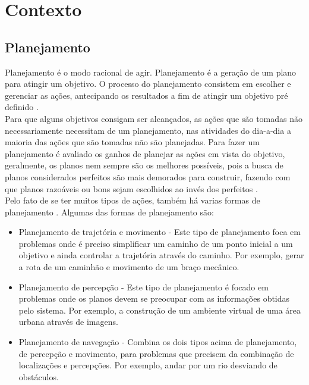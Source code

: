 \chapter{\label{chap:conte}Contexto}


\section{Planejamento} 


Planejamento é o modo racional de agir. Planejamento é a geração de um plano para atingir um objetivo. O processo do planejamento consistem em escolher e gerenciar as ações, antecipando os resultados a fim de atingir um objetivo pré definido \cite{ghallab2004automated}. \\
Para que alguns objetivos consigam ser alcançados, as ações que são tomadas não necessariamente necessitam de um planejamento, nas atividades do dia-a-dia a maioria das ações que são tomadas não são planejadas. Para fazer um planejamento é avaliado os ganhos de planejar as ações em vista do objetivo, geralmente, os planos nem sempre são os melhores possíveis, pois a busca de planos considerados perfeitos são mais demorados para construir, fazendo com que planos razoáveis ou bons sejam escolhidos ao invés dos perfeitos \cite{ghallab2004automated}. \\
Pelo fato de se ter muitos tipos de ações, também há varias formas de planejamento \cite{ghallab2004automated}. Algumas das formas de planejamento são:

\begin{itemize}
	\item Planejamento de trajetória e movimento - Este tipo de planejamento foca em problemas onde é preciso simplificar um caminho de um ponto inicial a um objetivo e ainda controlar a trajetória através do caminho. Por exemplo, gerar a rota de um caminhão e movimento de um braço mecânico. 
	\item Planejamento de percepção - Este tipo de planejamento é focado em problemas onde os planos devem se preocupar com as informações obtidas pelo sistema. Por exemplo,  a construção de um ambiente virtual de uma área urbana através de imagens. 
	\item Planejamento de navegação - Combina os dois tipos acima de planejamento, de percepção e movimento, para problemas que precisem da combinação de localizações e percepções. Por exemplo, andar por um rio desviando de obstáculos.  
\end{itemize}
 
